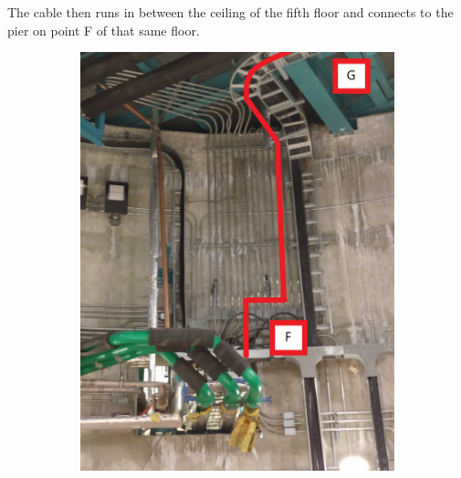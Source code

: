 The cable then runs in between the ceiling of the fifth floor and connects to the pier on point F of that same floor.


\begin{figure}
  \centering
  \begin{subfigure}{0.48\textwidth}
    \centering
    \includegraphics[width=\textwidth]{images/19.jpg}
  \end{subfigure}
  \hfill
  \begin{subfigure}{0.48\textwidth}
    \centering

\end{subfigure}
\end{figure}
